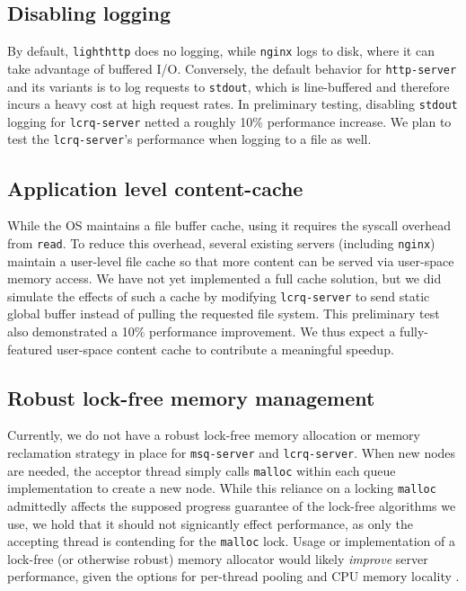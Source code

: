 \documentclass[twoside,10pt]{article}
\begin{document}
\begin{multicols}{2}
\subsection{Disabling logging}
By default, \verb+lighthttp+ does no logging, while \verb+nginx+ logs
to disk, where it can take advantage of buffered I/O. Conversely, the
default behavior for \verb+http-server+ and its variants is to log
requests to \verb+stdout+, which is line-buffered and therefore incurs
a heavy cost at high request rates. In preliminary testing, disabling
\verb+stdout+ logging for \verb+lcrq-server+ netted a roughly 10\%
performance increase. We plan to test the \verb+lcrq-server+'s
performance when logging to a file as well.

\subsection{Application level content-cache}
While the OS maintains a file buffer cache, using it requires the
syscall overhead from \verb+read+. To reduce this overhead, several
existing servers (including \verb+nginx+) maintain a user-level file
cache so that more content can be served via user-space memory
access. We have not yet implemented a full cache solution, but we did
simulate the effects of such a cache by modifying \verb+lcrq-server+
to send static global buffer instead of pulling the requested file
system. This preliminary test also demonstrated a 10\% performance
improvement. We thus expect a fully-featured user-space content cache
to contribute a meaningful speedup.

\subsection{Robust lock-free memory management}

Currently, we do not have a robust lock-free memory allocation or
memory reclamation strategy in place for \verb+msq-server+ and
\verb+lcrq-server+. When new nodes are needed, the acceptor thread
simply calls \verb+malloc+ within each queue implementation to create
a new node. While this reliance on a locking \verb+malloc+ admittedly
affects the supposed progress guarantee of the lock-free algorithms we
use, we hold that it should not signicantly effect performance, as
only the accepting thread is contending for the \verb+malloc+
lock. Usage or implementation of a lock-free (or otherwise robust)
memory allocator would likely \emph{improve} server performance, given the
options for per-thread pooling and CPU memory locality
\cite{hart2007performance}.


\end{multicols}
\end{document}
